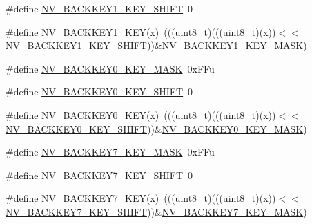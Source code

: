 \begin{DoxyCompactItemize}
\item 
\#define \hyperlink{group___n_v___register___masks_ga71418f17e11f902066ca404fbe473aef}{N\+V\+\_\+\+B\+A\+C\+K\+K\+E\+Y1\+\_\+\+K\+E\+Y\+\_\+\+S\+H\+I\+FT}~0
\item 
\#define \hyperlink{group___n_v___register___masks_gac336f640b5b887647407bd036aabb060}{N\+V\+\_\+\+B\+A\+C\+K\+K\+E\+Y1\+\_\+\+K\+EY}(x)~(((uint8\+\_\+t)(((uint8\+\_\+t)(x))$<$$<$\hyperlink{group___n_v___register___masks_ga71418f17e11f902066ca404fbe473aef}{N\+V\+\_\+\+B\+A\+C\+K\+K\+E\+Y1\+\_\+\+K\+E\+Y\+\_\+\+S\+H\+I\+FT}))\&\hyperlink{group___n_v___register___masks_ga6cd05d78b113df7f3cb0d11d29931666}{N\+V\+\_\+\+B\+A\+C\+K\+K\+E\+Y1\+\_\+\+K\+E\+Y\+\_\+\+M\+A\+SK})
\item 
\#define \hyperlink{group___n_v___register___masks_gafa0e31ca33d445d47d2fd89785e4ec9b}{N\+V\+\_\+\+B\+A\+C\+K\+K\+E\+Y0\+\_\+\+K\+E\+Y\+\_\+\+M\+A\+SK}~0x\+F\+Fu
\item 
\#define \hyperlink{group___n_v___register___masks_ga381e2b0a778da31fa6c795550e71aed8}{N\+V\+\_\+\+B\+A\+C\+K\+K\+E\+Y0\+\_\+\+K\+E\+Y\+\_\+\+S\+H\+I\+FT}~0
\item 
\#define \hyperlink{group___n_v___register___masks_ga1806932e2ff643e0bd9d9718dd0921a4}{N\+V\+\_\+\+B\+A\+C\+K\+K\+E\+Y0\+\_\+\+K\+EY}(x)~(((uint8\+\_\+t)(((uint8\+\_\+t)(x))$<$$<$\hyperlink{group___n_v___register___masks_ga381e2b0a778da31fa6c795550e71aed8}{N\+V\+\_\+\+B\+A\+C\+K\+K\+E\+Y0\+\_\+\+K\+E\+Y\+\_\+\+S\+H\+I\+FT}))\&\hyperlink{group___n_v___register___masks_gafa0e31ca33d445d47d2fd89785e4ec9b}{N\+V\+\_\+\+B\+A\+C\+K\+K\+E\+Y0\+\_\+\+K\+E\+Y\+\_\+\+M\+A\+SK})
\item 
\#define \hyperlink{group___n_v___register___masks_gac3f2bc7dd55b7951d70a5d1fcb6552b8}{N\+V\+\_\+\+B\+A\+C\+K\+K\+E\+Y7\+\_\+\+K\+E\+Y\+\_\+\+M\+A\+SK}~0x\+F\+Fu
\item 
\#define \hyperlink{group___n_v___register___masks_gad6bef74e61e792dfa5b7d195e4ce5620}{N\+V\+\_\+\+B\+A\+C\+K\+K\+E\+Y7\+\_\+\+K\+E\+Y\+\_\+\+S\+H\+I\+FT}~0
\item 
\#define \hyperlink{group___n_v___register___masks_ga2dbc4f6480af3ebaeeaf328a7f394c9f}{N\+V\+\_\+\+B\+A\+C\+K\+K\+E\+Y7\+\_\+\+K\+EY}(x)~(((uint8\+\_\+t)(((uint8\+\_\+t)(x))$<$$<$\hyperlink{group___n_v___register___masks_gad6bef74e61e792dfa5b7d195e4ce5620}{N\+V\+\_\+\+B\+A\+C\+K\+K\+E\+Y7\+\_\+\+K\+E\+Y\+\_\+\+S\+H\+I\+FT}))\&\hyperlink{group___n_v___register___masks_gac3f2bc7dd55b7951d70a5d1fcb6552b8}{N\+V\+\_\+\+B\+A\+C\+K\+K\+E\+Y7\+\_\+\+K\+E\+Y\+\_\+\+M\+A\+SK})
\item 
$$
\end{DoxyCompactItemize}
